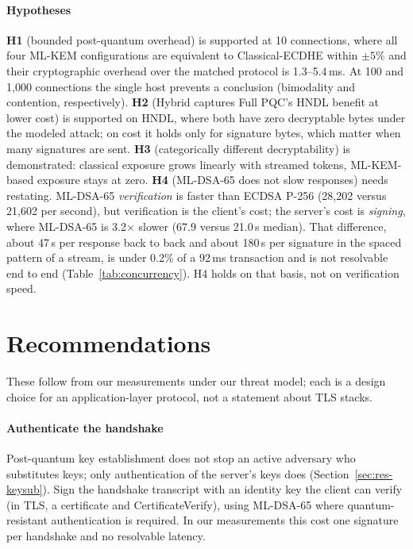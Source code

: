 \documentclass[conference]{IEEEtran}
\begin{document}
\paragraph*{Hypotheses} \textbf{H1} (bounded post-quantum overhead) is supported at 10 connections, where
all four ML-KEM configurations are equivalent to Classical-ECDHE within $\pm5\%$ and their cryptographic
overhead over the matched protocol is 1.3--5.4\,ms. At 100 and 1,000 connections the single host prevents a
conclusion (bimodality and contention, respectively).
\textbf{H2} (Hybrid captures Full PQC's HNDL benefit at lower cost) is supported on HNDL, where both have
zero decryptable bytes under the modeled attack; on cost it holds only for signature bytes, which matter
when many signatures are sent. \textbf{H3} (categorically different decryptability) is demonstrated:
classical exposure grows linearly with streamed tokens, ML-KEM-based exposure stays at zero.
\textbf{H4} (ML-DSA-65 does not slow responses) needs restating. ML-DSA-65 \emph{verification} is faster than
ECDSA P-256 (28,202 versus 21,602 per second), but verification is the client's cost; the server's cost is
\emph{signing}, where ML-DSA-65 is 3.2$\times$ slower (67.9 versus 21.0\,\textmu s median). That difference,
about 47\,\textmu s per response back to back and about 180\,\textmu s per signature in the spaced
pattern of a stream, is under 0.2\% of a 92\,ms transaction and is not resolvable end to end
(Table~\ref{tab:concurrency}). H4 holds on that basis, not on verification speed.

\section{Recommendations}

These follow from our measurements under our threat model; each is a design choice for an
application-layer protocol, not a statement about TLS stacks.

\paragraph*{Authenticate the handshake} Post-quantum key establishment does not stop an active
adversary who substitutes keys; only authentication of the server's keys does
(Section~\ref{sec:res-keysub}). Sign the handshake transcript with an identity key the client can verify
(in TLS, a certificate and CertificateVerify), using ML-DSA-65 where quantum-resistant authentication is
required. In our measurements this cost one signature per handshake and no resolvable latency.
\end{document}
